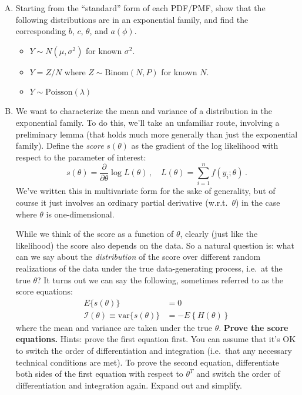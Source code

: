\documentclass{mynotes}
\begin{document}
\begin{enumerate}[(A)]

\item Starting from the ``standard'' form of each PDF/PMF, show that the following distributions are in an exponential family, and find the corresponding $b$, $c$, $\theta$, and $a(\phi)$.  

\begin{itemize}
\item $Y \sim N(\mu, \sigma^2)$ for known $\sigma^2$.  
\item $Y = Z/N$ where $Z \sim \mbox{Binom}(N, P)$ for known $N$.   
\item $Y \sim \mbox{Poisson}(\lambda)$  
\end{itemize}

\item We want to characterize the mean and variance of a distribution in the exponential family.  To do this, we'll take an unfamiliar route, involving a preliminary lemma (that holds much more generally than just the exponential family).  Define the \emph{score} $s(\theta)$ as the gradient of the log likelihood with respect to the parameter of interest:  
$$
s(\theta) = \frac{\partial}{\partial \theta} \log L(\theta) \, , \quad L(\theta) = \sum_{i=1}^n f(y_i; \theta) \, .
$$
We've written this in multivariate form for the sake of generality, but of course it just involves an ordinary partial derivative (w.r.t.~$\theta$) in the case where $\theta$ is one-dimensional.

While we think of the score as a function of $\theta$, clearly (just like the likelihood) the score also depends on the data.  So a natural question is: what can we say about the \emph{distribution} of the score over different random realizations of the data under the true data-generating process, i.e.~at the true $\theta$?  It turns out we can say the following, sometimes referred to as the score equations:  
$$
\begin{aligned}
E\{ s(\theta) \} &= 0 \\
\mathcal{I}(\theta) \equiv \mbox{var} \{ s(\theta) \}  &= - E \left\{ H(\theta) \right\}
\end{aligned}
$$
where the mean and variance are taken under the true $\theta$.  \textbf{Prove the score equations.}  Hints: prove the first equation first.  You can assume that it's OK to switch the order of differentiation and integration (i.e.~that any necessary technical conditions are met).  To prove the second equation, differentiate both sides of the first equation with respect to $\theta^T$ and switch the order of differentiation and integration again.  Expand out and simplify.  


\end{enumerate}
\end{document}
